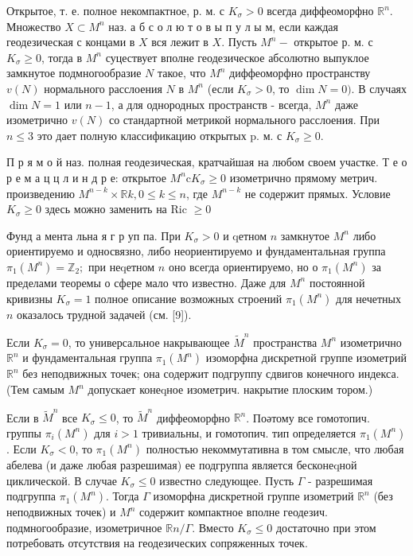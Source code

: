 \documentclass[10pt]{article}
\begin{document}
Открытое, т. е. полное некомпактное, р. м. с $K_{\sigma}>0$ всегда диффеоморфно $\mathbb{R}^{n}$. Множество $X \subset M^{n}$ наз. а б с о л ю т о в ы п у л ы м, если каждая геодезическая с концами в $X$ вся лежит в $X$. Пусть $M^{n}-$ открытое р. м. с $K_{\sigma} \geqslant 0$, тогда в $M^{n}$ суцествует вполне геодезическое абсолютно выпуклое замкнутое подмногообразие $N$ такое, что $M^{n}$ диффеоморфно пространству $v(N)$ нормального расслоения $N$ в $M^{n}$ (если $K_{\sigma}>0$, то $\operatorname{dim} N=0)$. В случаях $\operatorname{dim} N=1$ или $n-1$, а для однородных пространств - всегда, $M^{n}$ даже изометрично $v(N)$ со стандартной метрикой нормального расслоения. При $n \leqslant 3$ это дает полную классификацию открытых p. м. с $K_{\sigma} \geqslant 0$.



П р я м о й наз. полная геодезическая, кратчайшая на любом своем участке. Т е о р е м а ц ц л и н д р е: открытое $M^{n} \mathrm{c} K_{\sigma} \geqslant 0$ изометрично прямому метрич. произведению $M^{n-k} \times \mathbb{R} k, 0 \leqslant k \leqslant n$, где $M^{n-k}$ не содержит прямых. Условие $K_{\sigma} \geqslant 0$ здесь можно заменить на Ric $\geqslant 0$



Фунд а мента льна я г р уп па. При $K_{\sigma}>0$ и qетном $n$ замкнутое $M^{n}$ либо ориентируемо и односвязно, либо неориентируемо и фундаментальная группа $\pi_{1}\left(M^{n}\right)=\mathbb{Z}_{2} ;$ при неqетном $n$ оно всегда ориентируемо, но о $\pi_{1}\left(M^{n}\right)$ за пределами теоремы о сфере мало что известно. Даже для $M^{n}$ постоянной кривизны $K_{\sigma}=1$ полное описание возможных строений $\pi_{1}\left(M^{n}\right)$ для нечетных $n$ оказалось трудной задачей (см. [9]).



Если $K_{\sigma}=0$, то универсальное накрывающее $\tilde{M}^{n}$ пространства $M^{n}$ изометрично $\mathbb{R}^{n}$ и фундаментальная группа $\pi_{1}\left(M^{n}\right)$ изоморфна дискретной группе изометрий $\mathbb{R}^{n}$ без неподвижных точек; она содержит подгруппу сдвигов конечного индекса. (Тем самым $M^{n}$ допускает конеqное изометрич. накрытие плоским тором.)



Если в $\tilde{M}^{n}$ все $K_{\sigma} \leqslant 0$, то $\tilde{M}^{n}$ диффеоморфно $\mathbb{R}^{n}$. Поәтому все гомотопич. группы $\pi_{i}\left(M^{n}\right)$ для $i>1$ тривиальны, и гомотопич. тип определяется $\pi_{1}\left(M^{n}\right)$. Если $K_{\sigma}<0$, то $\pi_{1}\left(M^{n}\right)$ полностью некоммутативна в том смысле, что любая абелева (и даже любая разрешимая) ее подгруппа является бесконеqной циклической. В случае $K_{\sigma} \leqslant 0$ известно следующее. Пусть $\Gamma$ - разрешимая подгруппа $\pi_{1}\left(M^{n}\right)$. Тогда $\Gamma$ изоморфна дискретной группе изометрий $\mathbb{R}^{n}$ (без неподвижных точек) и $M^{n}$ содержит компактное вполне геодезич. подмногообразие, изометричное $\mathbb{R} n / \Gamma$. Вместо $K_{\sigma} \leqslant 0$ достаточно при этом потребовать отсутствия на геодезических сопряженных точек.
\end{document}
